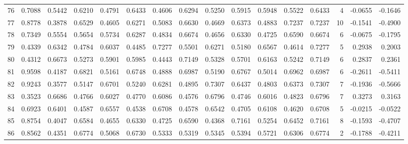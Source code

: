 \begin{tabular}{lrrrrrrrrrrrrrrr}
76  &      0.7088 &  0.5442 &  0.6210 &  0.4791 &  0.6433 &  0.4606 &  0.6294 &  0.5250 &  0.5915 &  0.5948 &   0.5522 &     0.6433 &      4 &                   -0.0655 &                    -0.1646 \\
77  &      0.8778 &  0.3878 &  0.6529 &  0.4605 &  0.6271 &  0.5083 &  0.6630 &  0.4669 &  0.6373 &  0.4883 &   0.7237 &     0.7237 &     10 &                   -0.1541 &                    -0.4900 \\
78  &      0.7349 &  0.5554 &  0.5654 &  0.5734 &  0.6287 &  0.4834 &  0.6674 &  0.4656 &  0.6330 &  0.4725 &   0.6590 &     0.6674 &      6 &                   -0.0675 &                    -0.1795 \\
79  &      0.4339 &  0.6342 &  0.4784 &  0.6037 &  0.4485 &  0.7277 &  0.5501 &  0.6271 &  0.5180 &  0.6567 &   0.4614 &     0.7277 &      5 &                    0.2938 &                     0.2003 \\
80  &      0.4312 &  0.6673 &  0.5273 &  0.5901 &  0.5985 &  0.4443 &  0.7149 &  0.5328 &  0.5701 &  0.6163 &   0.5242 &     0.7149 &      6 &                    0.2837 &                     0.2361 \\
81  &      0.9598 &  0.4187 &  0.6821 &  0.5161 &  0.6748 &  0.4888 &  0.6987 &  0.5190 &  0.6767 &  0.5014 &   0.6962 &     0.6987 &      6 &                   -0.2611 &                    -0.5411 \\
82  &      0.9243 &  0.3577 &  0.5147 &  0.6701 &  0.5240 &  0.6281 &  0.4895 &  0.7307 &  0.6437 &  0.4803 &   0.6373 &     0.7307 &      7 &                   -0.1936 &                    -0.5666 \\
83  &      0.3523 &  0.6686 &  0.4766 &  0.6027 &  0.4770 &  0.6086 &  0.4576 &  0.6796 &  0.4746 &  0.6016 &   0.4823 &     0.6796 &      7 &                    0.3273 &                     0.3163 \\
84  &      0.6923 &  0.6401 &  0.4587 &  0.6557 &  0.4538 &  0.6708 &  0.4578 &  0.6542 &  0.4705 &  0.6108 &   0.4620 &     0.6708 &      5 &                   -0.0215 &                    -0.0522 \\
85  &      0.8754 &  0.4047 &  0.6584 &  0.4655 &  0.6330 &  0.4725 &  0.6590 &  0.4368 &  0.7161 &  0.5254 &   0.6452 &     0.7161 &      8 &                   -0.1593 &                    -0.4707 \\
86  &      0.8562 &  0.4351 &  0.6774 &  0.5068 &  0.6730 &  0.5333 &  0.5319 &  0.5345 &  0.5394 &  0.5721 &   0.6306 &     0.6774 &      2 &                   -0.1788 &                    -0.4211 \\

\end{tabular}
